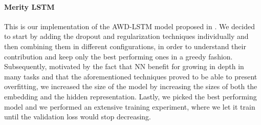 \paragraph{Merity LSTM}
This is our implementation of the AWD-LSTM model proposed in \cite{merity2017regularizing}. We decided to start by adding the dropout and regularization techniques individually and then combining them in different configurations, in order to understand their contribution and keep only the best performing ones in a greedy fashion. Subsequently, motivated by the fact that NN benefit for growing in depth in many tasks and that the aforementioned techniques proved to be able to present overfitting, we increased the size of the model by increasing the sizes of both the embedding and the hidden representation. Lastly, we picked the best performing model and we performed an extensive training experiment, where we let it train until the validation loss would stop decreasing.